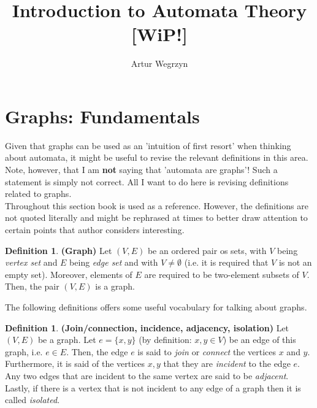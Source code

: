 \documentclass[12pt]{article}
\theoremstyle{plain}
\theoremstyle{definition}
\newtheorem{defn}[thm]{Definition}
\begin{document}
\title{Introduction to Automata Theory [WiP!]}
\author{Artur Wegrzyn}
\maketitle


\tableofcontents

\section{Graphs: Fundamentals}
Given that graphs can be used as an 'intuition of first resort' when thinking about 
automata, it might be useful to revise the relevant definitions in this area. \\
\indent Note, however, that I am \textbf{not} saying that 'automata are graphs'! 
Such a statement is simply not correct. All I want to do here is revising definitions 
related to graphs.
\\ \indent Throughout this section book \cite{intro_to_graph_theory} is used as a 
reference. However, the definitions are not quoted literally and might be rephrased 
at times to better draw attention to certain points that author considers interesting.

\begin{defn}
\textbf{(Graph)} Let $(V, E)$ be an ordered pair os sets, with $V$ being 
\textit{vertex set} and $E$ being \textit{edge set} and with $V \neq \emptyset$ (i.e.
it is required that $V$ is not an empty set). Moreover, elements of $E$ are required to 
be two-element subsets of $V$. Then, the pair $(V, E)$ is a graph.
\end{defn}

The following definitions offers some useful vocabulary for talking about graphs.

\begin{defn}
\textbf{(Join/connection, incidence, adjacency, isolation)} Let $(V, E)$ be a graph.
Let $e = \{x, y \}$ (by definition: $x, y \in V$) be an edge of this graph, 
i.e. $e \in E$. Then, the edge $e$ is said to \textit{join} or \textit{connect} the 
vertices $x$ and $y$. Furthermore, it is said of the vertices $x, y$ that they are 
\textit{incident} to the edge $e$. Any two edges that are incident to the same 
vertex are said to be \textit{adjacent}. Lastly, if there is a vertex that is 
not incident to any edge of a graph then it is called \textit{isolated}.
\end{defn}
\end{document}
